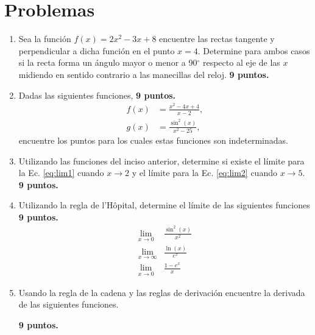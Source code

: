 \documentclass{article}
\begin{document}


\section{Problemas} %
\label{sec:problemas}

\begin{enumerate}

\item Sea la función $f(x)= 2x^{2} -3x + 8$ encuentre las rectas tangente y
perpendicular a dicha función en el punto $x=4$. Determine para ambos casos si
la recta forma un ángulo mayor o menor a 90$^{\circ}$ respecto al eje de las $x$
midiendo en sentido contrario a las manecillas del reloj.
\hfill \textbf{9 puntos.}

\item Dadas las siguientes funciones, 
\hfill \textbf{9 puntos.}
\begin{align}
f(x) &= \frac{x^{2} - 4x  + 4 }{x-2}, \label{eq:lim1}
\\
g(x) &= \frac{\sin^{2}(x)}{x^{2}-25}, \label{eq:lim2}
\end{align}
encuentre los puntos para los cuales estas funciones son indeterminadas.

\item Utilizando las funciones del inciso anterior, determine si existe el
límite para la Ec. \eqref{eq:lim1} cuando $x \rightarrow 2$ y el límite para la
Ec. \eqref{eq:lim2} cuando $x \rightarrow 5$. 
\hfill \textbf{9 puntos.}

\item Utilizando la regla de l'H\^opital, determine el límite de las siguientes
funciones
\hfill \textbf{9 puntos.}
\begin{align}
\label{eq:lop1}\lim_{x \rightarrow 0} &\frac{\sin^{2}(x)}{x^{2}}  \\
\label{eq:lop2}\lim_{x \rightarrow \infty} &\frac{\ln(x)}{e^x} \\
\label{eq:lop3}\lim_{x \rightarrow 0} &\frac{1-e^{x}}{x}
\end{align}

\item Usando la regla de la cadena y las reglas de derivación encuentre la
derivada de las siguientes funciones.

\hfill \textbf{9 puntos.}


\end{enumerate}
\end{document}
